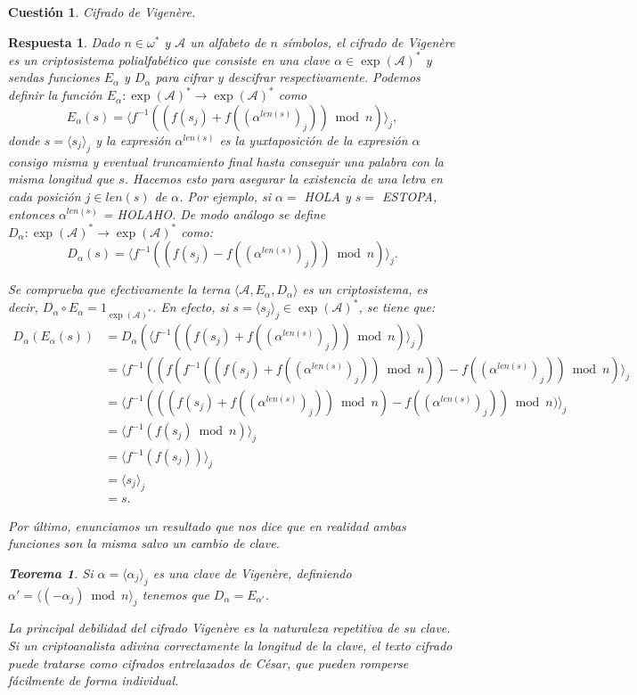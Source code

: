 \documentclass[
  a4paper,
  spanish,
  12pt,
]{scrartcl}
\theoremstyle{ejercicio-style}
\newtheorem{ejer}{Cuestión}
\theoremstyle{remark-style}
\newtheorem*{sol}{Respuesta}
\theoremstyle{teorema-style}
\newtheorem*{nth}{Teorema}
\begin{document}
\newpage

\begin{ejer}
  Cifrado de Vigenère.
\end{ejer}

\begin{sol}
  Dado $n \in \omega^\ast$ y $\mathcal{A}$ un alfabeto de $n$ símbolos, el cifrado de Vigenère es un criptosistema polialfabético que consiste en una clave $\alpha\in \exp (\mathcal{A})^*$ y sendas funciones $E_\alpha$ y $D_\alpha$ para cifrar y descifrar respectivamente. Podemos definir la función $E_\alpha: \exp (\mathcal{A})^* \to \exp (\mathcal{A})^*$ como
\[ E_\alpha (s) = \langle f^{-1}( (f(s_j) + f((\alpha^{len(s)})_j)) \bmod  n)\rangle _j, \]
donde $s = \langle s_j \rangle_j$ y la expresión $\alpha^{len(s)}$ es la yuxtaposición de la expresión $\alpha$ consigo misma y eventual truncamiento final hasta conseguir una palabra con la misma longitud que $s$. Hacemos esto para asegurar la existencia de una letra en cada posición $j \in len(s)$ de $\alpha$. Por ejemplo, si $\alpha = $ HOLA y $s=$ ESTOPA, entonces $\alpha^{len(s)}$ = HOLAHO. De modo análogo se define $D_\alpha: \exp (\mathcal{A})^* \to \exp (\mathcal{A})^*$ como:
 \[D_\alpha (s) = \langle f^{-1}( (f(s_j) - f((\alpha^{len(s)})_j)) \bmod  n)\rangle _j.\]

  Se comprueba que efectivamente la terna $\langle \mathcal{A}, E_\alpha, D_\alpha \rangle$ es un criptosistema, es decir,  $D_\alpha \circ E_\alpha = 1_{\exp(\mathcal A)^*}$. En efecto, si $s=\langle s_j \rangle _j \in \exp(\mathcal A)^*$, se tiene que:
\begin{align*}
  D_\alpha(E_\alpha(s)) &= D_\alpha(\langle f^{-1}( (f(s_j) + f((\alpha^{len(s)})_j)) \bmod  n)\rangle _j)\\
  &= \langle f^{-1}((f(f^{-1}( (f(s_j) + f((\alpha^{len(s)})_j)) \bmod  n)) - f((\alpha^{len(s)})_j)) \bmod  n)\rangle _j\\
  &= \langle f^{-1}(( (f(s_j) + f((\alpha^{len(s)})_j)) \bmod  n) - f((\alpha^{len(s)})_j)) \bmod  n)\rangle _j\\
  &= \langle f^{-1}(f(s_j)\bmod  n)\rangle _j\\
  &= \langle f^{-1}(f(s_j))\rangle _j\\
  &= \langle s_j\rangle _j\\
  &= s.
\end{align*}

  Por último, enunciamos un resultado que nos dice que en realidad ambas funciones son la misma salvo un cambio de clave.

\begin{nth}
      Si $\alpha = \langle \alpha_j \rangle_j$ es una clave de Vigenère, definiendo $\alpha' = \langle (-\alpha_j) \bmod  n \rangle _j$ tenemos que $D_\alpha = E_{\alpha'}$.
\end{nth}


La principal debilidad del cifrado Vigenère es la naturaleza repetitiva de su clave. Si un criptoanalista adivina correctamente la longitud de la clave, el texto cifrado puede tratarse como cifrados entrelazados de César, que pueden romperse fácilmente de forma individual.
\end{sol}
\end{document}
